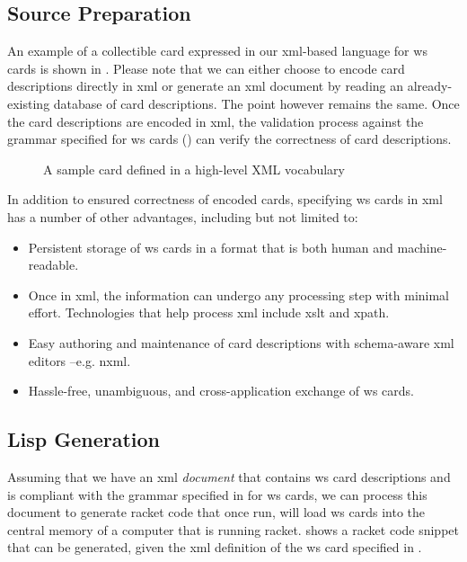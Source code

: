 \documentclass[10pt,oneside,a4paper]{skh-scrreprt}
\begin{document}
\subsection{Source Preparation}

An example 
of a collectible card
expressed in our 
\gls{xml}-based language
for \gls{ws} cards is shown in 
.
Please note that
we can either choose 
to encode card descriptions 
directly in \gls{xml} 
or generate an \gls{xml} document
by reading an already-existing
database of card descriptions. 
The point however remains the same. 
Once the card descriptions 
are encoded in \gls{xml}, 
the validation process against 
the grammar specified for \gls{ws} cards
() can verify the 
correctness of card descriptions.

\begin{figure}[h]\label{fig:sample-card-in-xml}
\caption[Sample Warstorm Card in XML Format]{%
A sample card defined in a high-level XML vocabulary}

\end{figure}

In addition to ensured correctness of 
encoded cards, specifying \gls{ws} 
cards in \gls{xml} has a number of 
other advantages, 
including but not limited to:
\begin{itemize}
\item Persistent storage of \gls{ws} cards 
  in a format that is both
  human and machine-readable.
\item 
  Once in \gls{xml}, the information can
  undergo any processing step with minimal effort.
  Technologies that help process \gls{xml} include
  \gls{xslt} and \gls{xpath}.
\item
  Easy authoring and maintenance of card descriptions
  with schema-aware \gls{xml} editors --e.g. \gls{nxml}.
\item Hassle-free, unambiguous, and cross-application 
  exchange of \gls{ws} cards.
\end{itemize}

\subsection{Lisp Generation}

Assuming that we have an \gls{xml} 
\emph{document} that contains \gls{ws} 
card descriptions and is compliant with
the grammar specified in 
for \gls{ws} cards, we can process this document
to generate \gls{racket} code that once run,
will load \gls{ws} cards into 
the central memory of a computer that is
running \gls{racket}.
 shows a
\gls{racket} code snippet that can be generated,
given the \gls{xml} definition of the
\gls{ws} card specified in .
\end{document}
